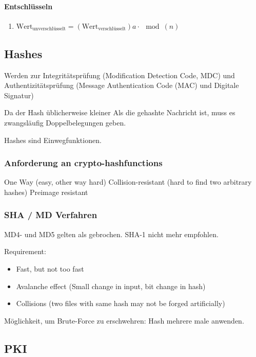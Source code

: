 \paragraph{Entschlüsseln}
\begin{enumerate}
	\item $\text{Wert}_\text{unverschlüsselt} = (\text{Wert}_\text{verschlüsselt}) a \cdot \mod(n)$
\end{enumerate}

\subsection{Hashes}

Werden zur Integritätsprüfung (Modification Detection Code, MDC) und Authentizitätsprüfung (Message Authentication Code (MAC) und Digitale Signatur)

Da der Hash üblicherweise kleiner Als die gehashte Nachricht ist, muss es zwangsläufig Doppelbelegungen geben.

Hashes sind Einwegfunktionen.

\subsubsection{Anforderung an crypto-hashfunctions}

One Way (easy, other way hard)
Collision-resistant (hard to find two arbitrary hashes)
Preimage resistant 

\subsubsection{SHA / MD Verfahren}



MD4- und MD5 gelten als gebrochen. SHA-1 nicht mehr empfohlen.

Requirement:
\begin{itemize}
	\item Fast, but not too fast
	\item Avalanche effect (Small change in input, bit change in hash)
	\item Collisions (two files with same hash may not be forged artificially)
\end{itemize}

Möglichkeit, um Brute-Force zu erschwehren: Hash mehrere male anwenden.

\subsection{PKI}

